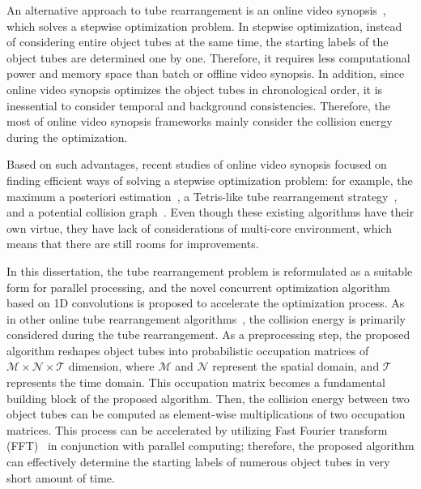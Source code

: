 \documentclass[11pt]{hyu_thesis}
\begin{document}
An alternative approach to tube rearrangement is an online video synopsis~\cite{Huang2014,ShikunFeng2012,JianqingZhu2015,He2017,Fu2014}, which solves a stepwise optimization problem. In stepwise optimization, instead of considering entire object tubes at the same time, the starting labels of the object tubes are determined one by one. Therefore, it requires less computational power and memory space than batch or offline video synopsis. In addition, since online video synopsis optimizes the object tubes in chronological order, it is inessential to consider temporal and background consistencies. Therefore, the most of online video synopsis frameworks mainly consider the collision energy during the optimization.

Based on such advantages, recent studies of online video synopsis focused on finding efficient ways of solving a stepwise optimization problem: for example, the maximum a posteriori estimation~\cite{Huang2014}, a Tetris-like tube rearrangement strategy~\cite{ShikunFeng2012,JianqingZhu2015}, and a potential collision graph~\cite{He2017}. 
Even though these existing algorithms have their own virtue, they have lack of considerations of multi-core environment, which means that there are still rooms for improvements.

In this dissertation, the tube rearrangement problem is reformulated as a suitable form for parallel processing, and the novel concurrent optimization algorithm based on 1D convolutions is proposed to accelerate the optimization process. As in other online tube rearrangement algorithms~\cite{Huang2014,ShikunFeng2012,JianqingZhu2015,He2017,Fu2014}, the collision energy is primarily considered during the tube rearrangement. As a preprocessing step, the proposed algorithm reshapes object tubes into probabilistic occupation matrices of $\mathcal{M} \times \mathcal{N} \times \mathcal{T}$ dimension, where $\mathcal{M}$ and $\mathcal{N}$ represent the spatial domain, and $\mathcal{T}$ represents the time domain. This occupation matrix becomes a fundamental building block of the proposed algorithm. Then, the collision energy between two object tubes can be computed as element-wise multiplications of two occupation matrices. This process can be accelerated by utilizing Fast Fourier transform (FFT)~\cite{Oppenheim2009} in conjunction with parallel computing; therefore, the proposed algorithm can effectively determine the starting labels of numerous object tubes in very short amount of time.
\end{document}
